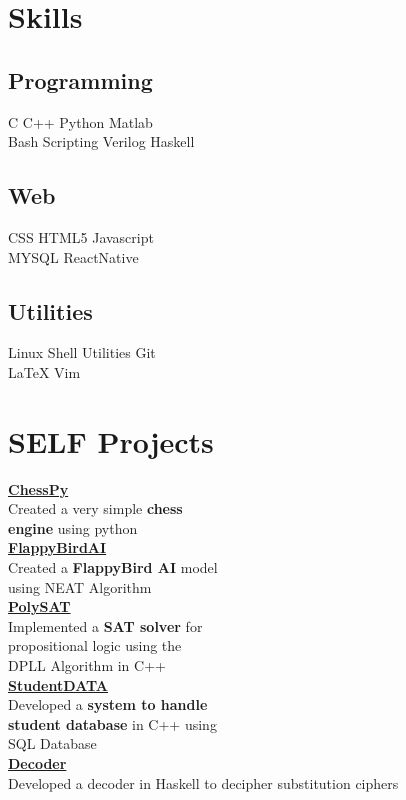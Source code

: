 \documentclass[]{deedy-resume-openfont}
\begin{document}
\begin{minipage}[t]{0.33\textwidth}
\section{Skills}
\subsection{Programming}
\textbullet{} C \textbullet{}   C++ \textbullet{} Python \textbullet{} Matlab \\ 
\textbullet{} Bash Scripting \textbullet Verilog \textbullet{} Haskell\\
\subsection{Web}
\textbullet{} CSS \textbullet{} HTML5 \textbullet{} Javascript\\
 \textbullet{}MYSQL \textbullet{}ReactNative   \\
\subsection{Utilities}
\textbullet{} Linux Shell Utilities \textbullet{} Git \\
\textbullet{} \LaTeX \textbullet{} Vim
\section{SELF Projects}
\textbf{\large \href{https://github.com/RohitRanjangit/chessPY}{ChessPy}}\\
Created  a very simple \textbf{ chess\\
 engine} using python\\
\textbf{\large \href{https://github.com/RohitRanjangit/FlappyBirdAI}{FlappyBirdAI}}\\
Created a \textbf{FlappyBird AI} model\\
 using NEAT Algorithm\\
\textbf{\large \href{https://github.com/RohitRanjangit/PolySAT} {PolySAT}}\\
Implemented a \textbf{ SAT solver} for\\
propositional logic using the\\
DPLL Algorithm in C++\\
\textbf{\large \href{https://github.com/RohitRanjangit/StudentData}{StudentDATA}}\\
Developed a \textbf{ system to handle\\
student database} in C++ using\\ SQL Database\\
\textbf{\large \href{https://github.com/RohitRanjangit/Decoder}{Decoder}}\\
Developed a decoder in Haskell to decipher substitution ciphers
%
%
\end{minipage} 
\end{document}
